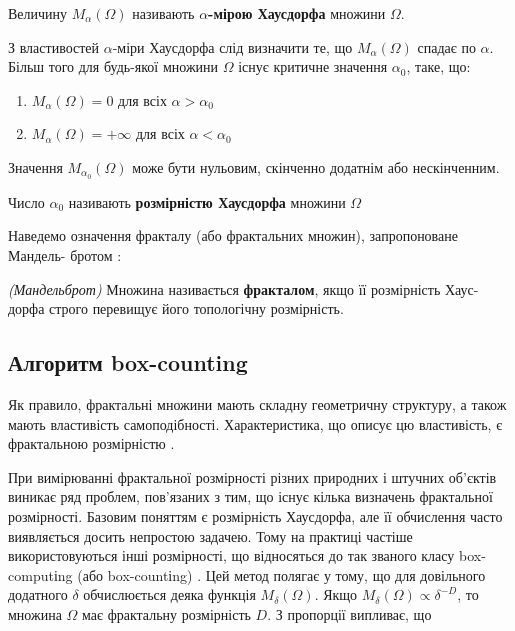 \begin{defn}
	Величину $M_{\alpha}(\Omega)$ називають \textbf{$\alpha$-мірою Хаусдорфа} множини $\Omega$.
\end{defn}

З властивостей $\alpha$-міри Хаусдорфа слід визначити те, що $M_{\alpha}(\Omega)$ спадає по $\alpha$. Більш того для будь-якої множини $\Omega$ існує критичне значення $\alpha_0$, таке, що:
\begin{enumerate}
	\item $M_{\alpha}(\Omega)=0$ для всіх $\alpha>\alpha_0$
	\item $M_{\alpha}(\Omega)=+\infty$ для всіх $\alpha<\alpha_0$
\end{enumerate}

Значення $M_{\alpha_0}(\Omega)$ може бути нульовим, скінченно додатнім або нескінченним.

\begin{defn}
	Число $\alpha_0$ називають \textbf{розмірністю Хаусдорфа} множини $\Omega$
\end{defn}

Наведемо означення фракталу (або фрактальних множин), запропоноване Мандель- бротом \citep{book:mandelbrot}: 

\begin{defn}
	\emph{(Мандельброт)}
	Множина називається \textbf{фракталом}, якщо її розмірність Хаус- дорфа строго перевищує його топологічну розмірність.
\end{defn} 


\subsection{Алгоритм box-counting}

Як правило, фрактальні множини мають складну геометричну структуру, а також мають властивість самоподібності. Характеристика, що описує цю властивість, є фрактальною розмірністю \citep{book:voss}.

При вимірюванні фрактальної розмірності різних природних і штучних
об'єктів виникає ряд проблем, пов'язаних з тим, що існує кілька визначень фрактальної розмірності. Базовим поняттям є розмірність Хаусдорфа, але її обчислення часто виявляється досить непростою задачею. Тому на практиці частіше використовуються інші розмірності, що відносяться до так званого класу box-computіng (або box-countіng) \citep{bib:boxcount}. Цей метод полягає у тому, що для довільного додатного $\delta$ обчислюється деяка функція $M_{\delta}(\Omega)$. Якщо $M_{\delta}(\Omega) \propto \delta^{-D}$, то множина $\Omega$ має фрактальну розмірність $D$. З пропорції випливає, що

